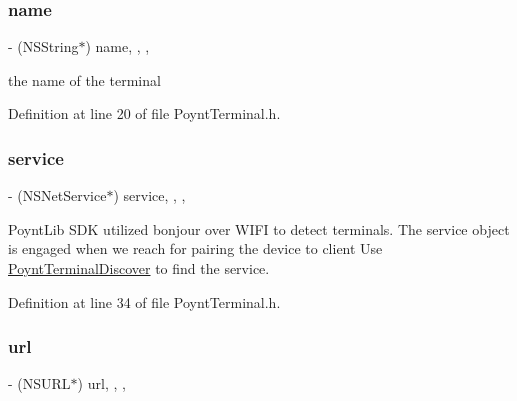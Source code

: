 \hypertarget{interface_poynt_terminal_a4b93d352d2fca75b34e1b5a50e03f587}{}\label{interface_poynt_terminal_a4b93d352d2fca75b34e1b5a50e03f587} 
\subsubsection{\texorpdfstring{name}{name}}
{\footnotesize\ttfamily -\/ (N\+S\+String$\ast$) name\hspace{0.3cm}{\ttfamily [read]}, {\ttfamily [write]}, {\ttfamily [nonatomic]}, {\ttfamily [strong]}}



the name of the terminal 



Definition at line 20 of file Poynt\+Terminal.\+h.

\hypertarget{interface_poynt_terminal_a4c12c4a257de1f39c44a0a72b272246a}{}\label{interface_poynt_terminal_a4c12c4a257de1f39c44a0a72b272246a} 
\subsubsection{\texorpdfstring{service}{service}}
{\footnotesize\ttfamily -\/ (N\+S\+Net\+Service$\ast$) service\hspace{0.3cm}{\ttfamily [read]}, {\ttfamily [write]}, {\ttfamily [nonatomic]}, {\ttfamily [strong]}}



Poynt\+Lib S\+DK utilized bonjour over W\+I\+FI to detect terminals. The service object is engaged when we reach for pairing the device to client  Use \hyperlink{interface_poynt_terminal_discover}{Poynt\+Terminal\+Discover} to find the service. 



Definition at line 34 of file Poynt\+Terminal.\+h.

\hypertarget{interface_poynt_terminal_a8d02094b967129e59efcc8c670677184}{}\label{interface_poynt_terminal_a8d02094b967129e59efcc8c670677184} 
\subsubsection{\texorpdfstring{url}{url}}
{\footnotesize\ttfamily -\/ (N\+S\+U\+RL$\ast$) url\hspace{0.3cm}{\ttfamily [read]}, {\ttfamily [write]}, {\ttfamily [nonatomic]}, {\ttfamily [strong]}}



